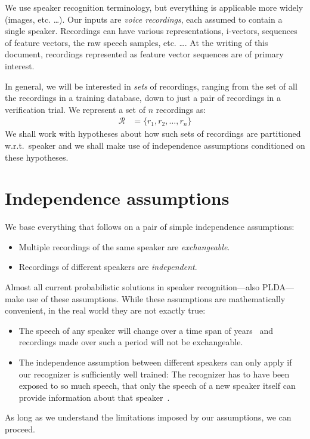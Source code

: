 \documentclass[a4paper,oneside,12pt,english]{report}
\def\Rset{\mathcal{R}}
\begin{document}
We use speaker recognition terminology, but everything is applicable more widely (images, etc. \ldots). Our inputs are \emph{voice recordings}, each assumed to contain a single speaker. Recordings can have various representations, i-vectors, sequences of feature vectors, the raw speech samples, etc. \ldots. At the writing of this document, recordings represented as feature vector sequences are of primary interest.  

In general, we will be interested in \emph{sets} of recordings, ranging from the set of all the recordings in a training database, down to just a pair of recordings in a verification trial. We represent a set of $n$ recordings as:
\begin{align*}
\Rset &=\{r_1,r_2,\ldots,r_n\}
\end{align*}
We shall work with hypotheses about how such sets of recordings are partitioned w.r.t.\ speaker and we shall make use of independence assumptions conditioned on these hypotheses. 

\section{Independence assumptions}
\label{sec:IS}
We base everything that follows on a pair of simple independence assumptions: 
\begin{itemize}
	\item Multiple recordings of the same speaker are \emph{exchangeable}.
	\item Recordings of different speakers are \emph{independent}. 
\end{itemize}
Almost all current probabilistic solutions in speaker recognition---also PLDA---make use of these assumptions. While these assumptions are mathematically convenient, in the real world they are not exactly true: 
\begin{itemize}
	\item The speech of any speaker will change over a time span of years~\cite{Finnian} and recordings made over such a period will not be exchangeable. 
	\item The independence assumption between different speakers can only apply if our recognizer is sufficiently well trained: The recognizer has to have been exposed to so much speech, that only the speech of a new speaker itself can provide information about that speaker~\cite{Jesus_IS11}.
\end{itemize}
As long as we understand the limitations imposed by our assumptions, we can proceed.  \\
\end{document}

